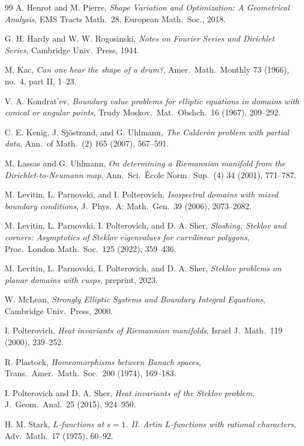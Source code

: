 \documentclass[11pt,reqno]{amsart}
\theoremstyle{plain}
\theoremstyle{definition}
\theoremstyle{remark}
\begin{document}
\begin{thebibliography}{99}
A. Henrot and M. Pierre,
\emph{Shape Variation and Optimization: A Geometrical Analysis},
EMS Tracts Math.\ 28, European Math.\ Soc., 2018.

G. H. Hardy and W. W. Rogosinski,
\emph{Notes on Fourier Series and Dirichlet Series},
Cambridge Univ.\ Press, 1944.

M. Kac,
\emph{Can one hear the shape of a drum?},
Amer.\ Math.\ Monthly 73 (1966), no.\ 4, part II, 1--23.

V. A. Kondrat'ev,
\emph{Boundary value problems for elliptic equations in domains with conical or angular points},
Trudy Moskov.\ Mat.\ Obshch.\ 16 (1967), 209--292.

C. E. Kenig, J. Sj\"ostrand, and G. Uhlmann,
\emph{The Calder\'on problem with partial data},
Ann.\ of Math.\ (2) 165 (2007), 567--591.

M. Lassas and G. Uhlmann,
\emph{On determining a Riemannian manifold from the Dirichlet-to-Neumann map},
Ann.\ Sci.\ \'Ecole Norm.\ Sup.\ (4) 34 (2001), 771--787.

M. Levitin, L. Parnovski, and I. Polterovich,
\emph{Isospectral domains with mixed boundary conditions},
J.\ Phys.\ A: Math.\ Gen.\ 39 (2006), 2073--2082.

M. Levitin, L. Parnovski, I. Polterovich, and D. A. Sher,
\emph{Sloshing, Steklov and corners: Asymptotics of Steklov eigenvalues for curvilinear polygons},
Proc.\ London Math.\ Soc.\ 125 (2022), 359--436.

M. Levitin, L. Parnovski, I. Polterovich, and D. A. Sher,
\emph{Steklov problems on planar domains with cusps},
preprint, 2023.

W. McLean,
\emph{Strongly Elliptic Systems and Boundary Integral Equations},
Cambridge Univ.\ Press, 2000.

I. Polterovich,
\emph{Heat invariants of Riemannian manifolds},
Israel J.\ Math.\ 119 (2000), 239--252.

R. Plastock,
\emph{Homeomorphisms between Banach spaces},
Trans.\ Amer.\ Math.\ Soc.\ 200 (1974), 169--183.

I. Polterovich and D. A. Sher,
\emph{Heat invariants of the Steklov problem},
J.\ Geom.\ Anal.\ 25 (2015), 924--950.

H. M. Stark,
\emph{$L$-functions at $s=1$. II. Artin $L$-functions with rational characters},
Adv.\ Math.\ 17 (1975), 60--92.


\end{thebibliography}
\end{document}
